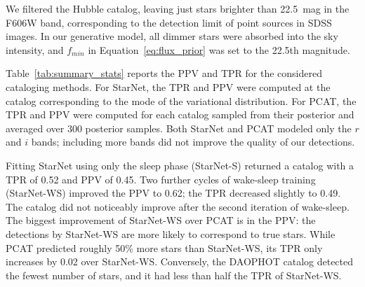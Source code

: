 We filtered the Hubble catalog, leaving just stars brighter than 22.5~mag in the F606W band, corresponding to the detection limit of point sources in SDSS images. 
In our generative model, all dimmer stars were absorbed into the sky intensity, and $f_{min}$ in Equation~\eqref{eq:flux_prior} was set to the 22.5th magnitude. 

Table~\ref{tab:summary_stats} reports the PPV and TPR for the considered cataloging methods.
For StarNet, the TPR and PPV were computed at the catalog corresponding to the mode of the variational distribution. 
For PCAT, the TPR and PPV were computed for each catalog sampled from their posterior and averaged over 300 posterior samples. 
Both StarNet and PCAT modeled only the $r$ and $i$ bands;
including more bands did not improve the quality of our detections. 

Fitting StarNet using only the sleep phase (StarNet-S) returned 
a catalog with a TPR of 0.52 and PPV of 0.45. Two further cycles of wake-sleep training (StarNet-WS) improved the PPV to 0.62; the TPR decreased slightly to 0.49.
The catalog did not noticeably improve after the second iteration of wake-sleep. 
The biggest improvement of StarNet-WS over PCAT is in the PPV: 
the detections by StarNet-WS are more likely to correspond to 
true stars. 
While PCAT predicted roughly 50\% more stars than StarNet-WS, 
its TPR only increases by 0.02 over StarNet-WS. 
Conversely, the DAOPHOT catalog detected the fewest number of stars, and it had less than half the TPR of StarNet-WS.




